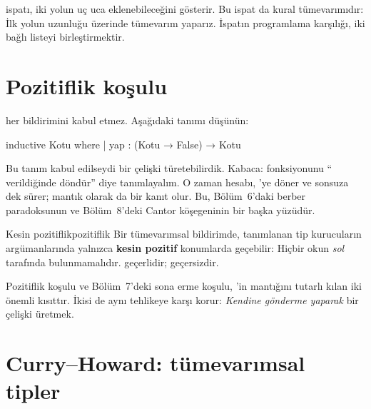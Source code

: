 \noindent {} ispatı, iki yolun uç uca eklenebileceğini
gösterir. Bu ispat da kural tümevarımıdır: İlk yolun uzunluğu üzerinde
tümevarım yaparız. İspatın programlama karşılığı, iki bağlı listeyi
birleştirmektir.

\section{Pozitiflik koşulu}\label{sec:pozitiflik}

\Lean{} her  bildirimini kabul etmez. Aşağıdaki tanımı
düşünün:

\begin{leankod}
inductive Kotu where
  | yap : (Kotu → False) → Kotu
\end{leankod}


\noindent Bu tanım kabul edilseydi bir çelişki türetebilirdik. Kabaca:
 fonksiyonunu `` verildiğinde
 döndür'' diye tanımlayalım. O zaman  hesabı,
'ye döner ve sonsuza dek sürer; mantık olarak da
 bir kanıt olur. Bu, Bölüm~6'daki berber
paradoksunun ve Bölüm~8'deki Cantor köşegeninin bir başka yüzüdür.

\begin{tanim}{Kesin pozitiflik}{pozitiflik}
Bir tümevarımsal bildirimde, tanımlanan tip kurucuların argümanlarında
yalnızca \textbf{kesin pozitif} konumlarda geçebilir: Hiçbir okun
\emph{sol} tarafında bulunmamalıdır. 
geçerlidir;  geçersizdir.
\end{tanim}

\noindent Pozitiflik koşulu ve Bölüm~7'deki sona erme koşulu, \Lean{}'in
mantığını tutarlı kılan iki önemli kısıttır. İkisi de aynı tehlikeye karşı
korur: \emph{Kendine gönderme yaparak} bir çelişki üretmek.

\section{Curry--Howard: tümevarımsal tipler}\label{sec:curry-howard-5}

